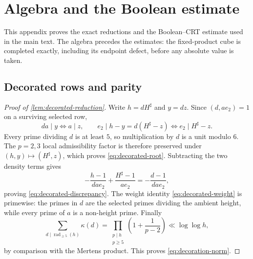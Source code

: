 \documentclass[11pt]{article}
\theoremstyle{definition}
\theoremstyle{remark}
\newcommand{\rad}{\operatorname{rad}}
\newcommand{\1}{\mathbf 1}
\begin{document}
\appendix

\section{Algebra and the Boolean estimate}\label{app:boolean}

This appendix proves the exact reductions and the Boolean--CRT estimate used in the main text.  The algebra precedes the estimates: the fixed-product cube is completed exactly, including its endpoint defect, before any absolute value is taken.

\subsection{Decorated rows and parity}

\begin{proof}[Proof of \cref{lem:decorated-reduction}]
Write $h=dH^\sharp$ and $y=dz$.  Since $(d,ae_2)=1$ on a surviving selected row,
\[
da\mid y\Longleftrightarrow a\mid z,
\qquad
e_2\mid h-y=d(H^\sharp-z)\Longleftrightarrow e_2\mid H^\sharp-z.
\]
Every prime dividing $d$ is at least $5$, so multiplication by $d$ is a unit modulo $6$.  The $p=2,3$ local admissibility factor is therefore preserved under $(h,y)\mapsto(H^\sharp,z)$, which proves \cref{eq:decorated-root}.  Subtracting the two density terms gives
\[
-\frac{h-1}{dae_2}+\frac{H^\sharp-1}{ae_2}
=-\frac{d-1}{dae_2},
\]
proving \cref{eq:decorated-discrepancy}.  The weight identity \cref{eq:decorated-weight} is primewise: the primes in $d$ are the selected primes dividing the ambient height, while every prime of $a$ is a non-height prime.  Finally
\[
\sum_{d\mid\rad_{\ge5}(h)}\kappa(d)
=\prod_{\substack{p\mid h\\p\ge5}}\left(1+\frac1{p-2}\right)
\ll\log\log h,
\]
by comparison with the Mertens product.  This proves \cref{eq:decoration-norm}.
\end{proof}
\end{document}
